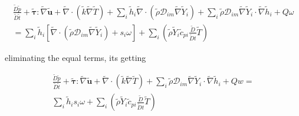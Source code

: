 \documentclass[preprint,12pt,authoryear]{elsarticle}
\begin{document}
\begin{equation}
\begin{split}
        \frac{\tilde{D} \tilde{p}}{\tilde{D}\tilde{t}}
        +       
        \pmb{\tilde{\tau}}:\tilde{\nabla} \tilde{\mathbf{u}} 
        + 
        \tilde{\nabla} \cdot (\tilde{k}\tilde{\nabla} \tilde{T})
        +
        \sum\limits_i
        \tilde{h}_i
        \tilde{\nabla}\cdot
	(
	\tilde{\rho}\mathcal{D}_{im}\tilde{\nabla}\tilde{Y}_i
	)
        +
        \sum\limits_i 
        \tilde{\rho}
        \mathcal{D}_{im}
        \tilde{\nabla}
        \tilde{Y}_i     
        \cdot
        \tilde{\nabla} 
        \tilde{h}_i
        +
	Q\omega
	\\
        =
        \sum\limits_i
        \tilde{h}_i
        [
        	\tilde{\nabla}\cdot
		(
		\tilde{\rho}\mathcal{D}_{im}\tilde{\nabla}\tilde{Y}_i
		)
		+
        	s_i \omega
	    ]
        +
        \sum\limits_i
        \left(
                \tilde{\rho}
                \tilde{Y}_i
                \tilde{c}_{pi}
                \frac{\tilde{D}}{\tilde{D} t}
                \tilde{T}
        \right)
\end{split}
\end{equation}

eliminating the equal terms, its getting  

\begin{equation}
\begin{split}
        \frac{\tilde{D} \tilde{p}}{\tilde{D}\tilde{t}}
        +       
        \pmb{\tilde{\tau}}:\tilde{\nabla} \tilde{\mathbf{u}} 
        + 
        \tilde{\nabla} \cdot (\tilde{k}\tilde{\nabla} \tilde{T})
        +
        \sum\limits_i 
        \tilde{\rho}
        \mathcal{D}_{im}
        \tilde{\nabla}
        \tilde{Y}_i     
        \cdot
        \tilde{\nabla} 
        \tilde{h}_i
	+
	Qw
        =
        \\
        \sum\limits_i
        \tilde{h}_i
        s_i  \omega
	+
        \sum\limits_i
        \left(
                \tilde{\rho}
                \tilde{Y}_i
                \tilde{c}_{pi}
                \frac{\tilde{D}}{\tilde{D} t}
                \tilde{T}
        \right)
\end{split}
\end{equation}
\end{document}
